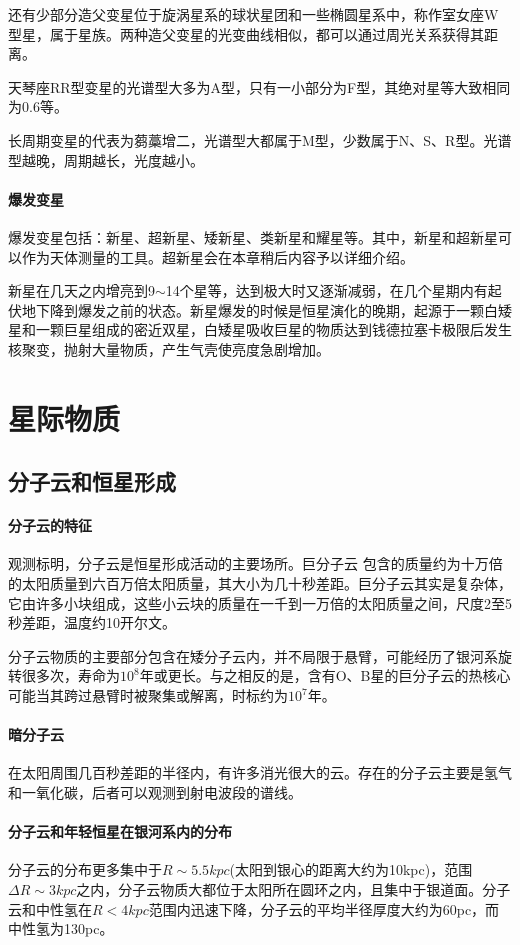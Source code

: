 还有少部分造父变星位于旋涡星系的球状星团和一些椭圆星系中，称作室女座W型星，属于星族。两种造父变星的光变曲线相似，都可以通过周光关系获得其距离。

天琴座RR型变星的光谱型大多为A型，只有一小部分为F型，其绝对星等大致相同为0.6等。

长周期变星的代表为蒭藁增二，光谱型大都属于M型，少数属于N、S、R型。光谱型越晚，周期越长，光度越小。

\paragraph{爆发变星}爆发变星包括：新星、超新星、矮新星、类新星和耀星等。其中，新星和超新星可以作为天体测量的工具。超新星会在本章稍后内容予以详细介绍。

新星在几天之内增亮到9$\sim$14个星等，达到极大时又逐渐减弱，在几个星期内有起伏地下降到爆发之前的状态。新星爆发的时候是恒星演化的晚期，起源于一颗白矮星和一颗巨星组成的密近双星，白矮星吸收巨星的物质达到钱德拉塞卡极限后发生核聚变，抛射大量物质，产生气壳使亮度急剧增加。
\section{星际物质}
\subsection{分子云和恒星形成}
\paragraph{分子云的特征}观测标明，分子云是恒星形成活动的主要场所。巨分子云 包含的质量约为十万倍的太阳质量到六百万倍太阳质量，其大小为几十秒差距。巨分子云其实是复杂体，它由许多小块组成，这些小云块的质量在一千到一万倍的太阳质量之间，尺度2至5秒差距，温度约10开尔文。

分子云物质的主要部分包含在矮分子云内，并不局限于悬臂，可能经历了银河系旋转很多次，寿命为$10^8$年或更长。与之相反的是，含有O、B星的巨分子云的热核心可能当其跨过悬臂时被聚集或解离，时标约为$10^7$年。
\paragraph{暗分子云}
在太阳周围几百秒差距的半径内，有许多消光很大的云。存在的分子云主要是氢气和一氧化碳，后者可以观测到射电波段的谱线。
\paragraph{分子云和年轻恒星在银河系内的分布}
分子云的分布更多集中于$R\sim5.5kpc$(太阳到银心的距离大约为10kpc)，范围$\Delta R\sim3kpc$之内，分子云物质大都位于太阳所在圆环之内，且集中于银道面。分子云和中性氢在$R<4kpc$范围内迅速下降，分子云的平均半径厚度大约为60pc，而中性氢为130pc。
